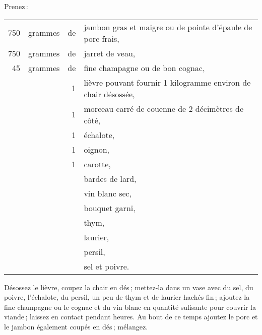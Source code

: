 Prenez :

\footnotesize
\begin{longtable}{rrrp{16em}}
    750 & grammes & de & jambon gras et maigre ou de pointe d'épaule de porc frais,                       \\
    750 & grammes & de & jarret de veau,                                                                  \\
     45 & grammes & de & fine champagne ou de bon cognac,                                                 \\
        &         &  1 & lièvre pouvant fournir 1 kilogramme environ de chair désossée,                   \\
        &         &  1 & morceau carré de couenne de 2 décimètres de côté,                                \\
        &         &  1 & échalote,                                                                        \\
        &         &  1 & oignon,                                                                          \\
        &         &  1 & carotte,                                                                         \\
        &         &    & bardes de lard,                                                                  \\
        &         &    & vin blanc sec,                                                                   \\
        &         &    & bouquet garni,                                                                   \\
        &         &    & thym,                                                                            \\
        &         &    & laurier,                                                                         \\
        &         &    & persil,                                                                          \\
        &         &    & sel et poivre.                                                                   \\
\end{longtable}
\normalsize

Désossez le lièvre, coupez la chair en dés ; mettez-la dans un vase avec du
sel, du poivre, l'échalote, du persil, un peu de thym et de laurier hachés
fin ; ajoutez la fine champagne ou le cognac et du vin blanc en quantité
sufisante pour couvrir la viande ; laissez en contact pendant {\mmm}
heures. Au bout de ce temps ajoutez le porc et le jambon également coupés en
dés ; mélangez.

